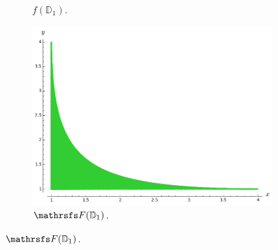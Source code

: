 \documentclass{beamer}
\begin{document}
\begin{frame}
\begin{figure}
\begin{subfigure}{.32\linewidth}
\caption{$f({\mathbb D}_1)$.}
\end{subfigure}
\begin{subfigure}{.32\linewidth}\centering
\includegraphics[width=1\textwidth]{plots/ch5_39_disc3.png}
\caption{$\FFF({\mathbb D}_1)$.}
\end{subfigure}
\end{figure}
\end{frame}
\end{document}
